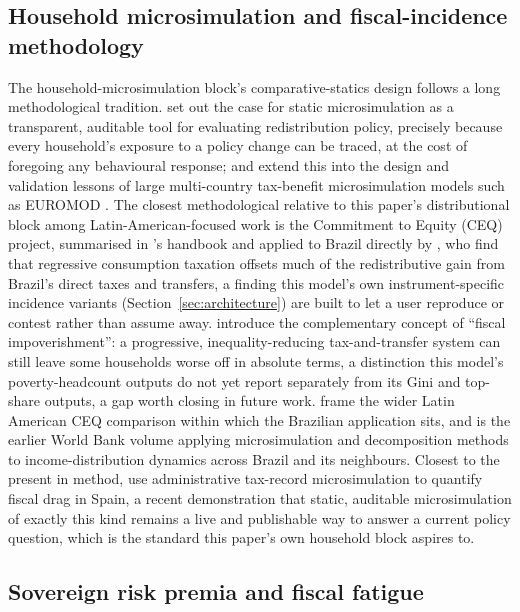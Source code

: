 \documentclass[11pt,a4paper]{article}
\begin{document}
\subsection{Household microsimulation and fiscal-incidence methodology}
\label{sec:lit-microsim}

The household-microsimulation block's comparative-statics design follows a long methodological tradition. \citet{bourguignonspadaro2006} set out the case for static microsimulation as a transparent, auditable tool for evaluating redistribution policy, precisely because every household's exposure to a policy change can be traced, at the cost of foregoing any behavioural response; \citet{immervollodonoghue2009} and \citet{figaripaulussutherland2015} extend this into the design and validation lessons of large multi-country tax-benefit microsimulation models such as EUROMOD \citep{sutherlandfigari2013}. The closest methodological relative to this paper's distributional block among Latin-American-focused work is the Commitment to Equity (CEQ) project, summarised in \citet{lustig2018ceq}'s handbook and applied to Brazil directly by \citet{higginspereira2014}, who find that regressive consumption taxation offsets much of the redistributive gain from Brazil's direct taxes and transfers, a finding this model's own instrument-specific incidence variants (Section~\ref{sec:architecture}) are built to let a user reproduce or contest rather than assume away. \citet{higginslustig2016} introduce the complementary concept of ``fiscal impoverishment'': a progressive, inequality-reducing tax-and-transfer system can still leave some households worse off in absolute terms, a distinction this model's poverty-headcount outputs do not yet report separately from its Gini and top-share outputs, a gap worth closing in future work. \citet{lustigpessinoscott2014} frame the wider Latin American CEQ comparison within which the Brazilian application sits, and \citet{bourguignonferreiralustig2004} is the earlier World Bank volume applying microsimulation and decomposition methods to income-distribution dynamics across Brazil and its neighbours. Closest to the present in method, \citet{balladaresgarciamiralles2026} use administrative tax-record microsimulation to quantify fiscal drag in Spain, a recent demonstration that static, auditable microsimulation of exactly this kind remains a live and publishable way to answer a current policy question, which is the standard this paper's own household block aspires to.

\subsection{Sovereign risk premia and fiscal fatigue}
\label{sec:lit-premium}
\end{document}
